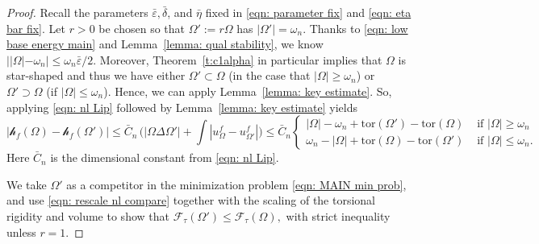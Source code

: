 \documentclass[10pt, reqno]{amsart}
\numberwithin{equation}{section}
\def\e{\varepsilon}
\def\W{\Omega}
\def\om{\omega}
\def\tor{\mathrm{tor}}
\def\err{\tau}
\def\Ep{\mathcal{F}_{\err}}
\def\nl{\mathscr{h}_f}
\def\baryEps{\bar{\e}}
\begin{document}
\begin{proof} Recall the parameters $\baryEps, \bar{\delta}$, and $\bar{\eta}$ fixed in \eqref{eqn: parameter fix} and \eqref{eqn: eta bar fix}.  Let $r>0$ be chosen so that $\W':= r\W$ has $|\W'|=\om_n$.
Thanks to \eqref{eqn: low base energy main} and Lemma~\ref{lemma: qual stability}, we know $||\W|-\om_n| \leq \om_n \baryEps/2$.
Moreover,  Theorem~\ref{t:c1alpha} in particular implies that $\W$ is star-shaped and thus we have either $\W' \subset\W$ (in the case that $|\W| \geq \omega_n $) or $\W' \supset \W$ (if $|\W| \leq \omega_n$). Hence, we can apply Lemma~\ref{lemma: key estimate}.  
 So, applying \eqref{eqn: nl Lip} followed by Lemma~\ref{lemma: key estimate} yields
    \begin{equation}\label{eqn: rescale nl compare}
 |\nl(\W) - \nl(\W')|  \leq \bar{C}_n\,\Big( |\W\Delta \W'| +\int |u_{\W}^f - u_{\W'}^f|\Big)\leq  \bar{C}_n
        \begin{cases}
           |\W| - \om_n+  \tor (\W') - \tor(\W) & \text{ if } |\W| \geq \om_n\\
      \om_n-   |\W| + \tor (\W) - \tor(\W') & \text{ if } |\W| \leq \om_n.
        \end{cases}
    \end{equation}
    Here $\bar{C}_n$ is the dimensional constant  from \eqref{eqn: nl Lip}.

    
We take $\W'$ as a competitor in the minimization problem \eqref{eqn: MAIN min prob}, and use \eqref{eqn: rescale nl compare} together with the scaling of the torsional rigidity and volume to show that $\Ep(\W') \leq \Ep(\W),$ with strict inequality unless $r=1$.


\end{proof}
\end{document}
